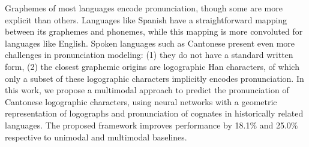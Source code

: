 Graphemes of most languages encode pronunciation, though some are more explicit than others. Languages like Spanish have a straightforward mapping between its graphemes and phonemes, while this mapping is more convoluted for languages like English. Spoken languages such as Cantonese present even more challenges in pronunciation modeling: (1) they do not have a standard written form, (2) the closest graphemic origins are logographic Han characters, of which only a subset of these logographic characters implicitly encodes pronunciation. In this work, we propose a multimodal approach to predict the pronunciation of Cantonese logographic characters, using neural networks with a geometric representation of logographs and pronunciation of cognates in historically related languages. The proposed framework improves performance by 18.1\% and 25.0\% respective to unimodal and multimodal baselines.
